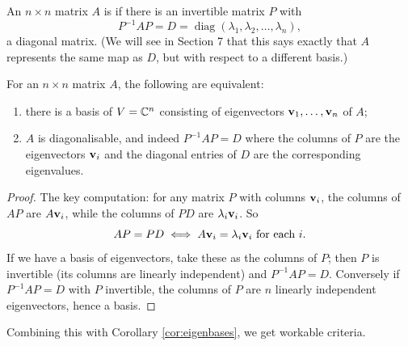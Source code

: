 \documentclass[a4paper]{scrartcl}
\newcommand{\diag}{\operatorname{diag}}
\begin{document}
\begin{definition}[Diagonalisable]
	An $n \times n$ matrix $A$ is  if there is an invertible matrix $P$ with
	$$
	P^{-1}AP = D = \diag(\lambda_1, \lambda_2, \dots, \lambda_n),
	$$
	a diagonal matrix. (We will see in Section 7 that this says exactly that $A$ represents the same map as $D$, but with respect to a different basis.)
\end{definition}

\begin{proposition}
	For an $n \times n$ matrix $A$, the following are equivalent:
	\begin{enumerate}[label=(\roman*)]
		\item there is a basis of $V = \mathbb{C}^n$ consisting of eigenvectors $\mathbf{v}_1, \dots, \mathbf{v}_n$ of $A$;
		\item $A$ is diagonalisable, and indeed $P^{-1}AP = D$ where the columns of $P$ are the eigenvectors $\mathbf{v}_i$ and the diagonal entries of $D$ are the corresponding eigenvalues.
	\end{enumerate}
\end{proposition}
\begin{proof}
	The key computation: for any matrix $P$ with columns $\mathbf{v}_i$, the columns of $AP$ are $A \mathbf{v}_i$, while the columns of $PD$ are $\lambda_i \mathbf{v}_i$. So
	$$
	AP = PD \iff A\mathbf{v}_i = \lambda_i \mathbf{v}_i \text{ for each } i.
	$$
	If we have a basis of eigenvectors, take these as the columns of $P$; then $P$ is invertible (its columns are linearly independent) and $P^{-1}AP = D$. Conversely if $P^{-1}AP = D$ with $P$ invertible, the columns of $P$ are $n$ linearly independent eigenvectors, hence a basis.
\end{proof}

Combining this with Corollary \ref{cor:eigenbases}, we get workable criteria.
\end{document}

